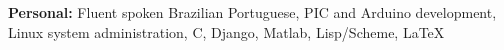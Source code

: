 \documentclass[11pt,letterpaper,sans]{moderncv}        %
\begin{document}
\vspace{6pt}

\textbf{Personal:} Fluent spoken Brazilian Portuguese, PIC and Arduino development, Linux system administration, C, Django, Matlab, Lisp/Scheme, \LaTeX


%


\end{document}
